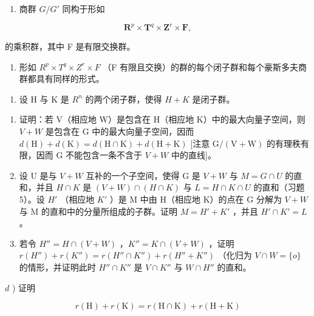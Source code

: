 \begin{enumerate}
\def\labelenumi{\alph{enumi})}
\tightlist
\item
  商群 \(G/G'\) 同构于形如
\end{enumerate}

\[
\mathbf {R} ^ {p} \times \mathbf {T} ^ {q} \times \mathbf {Z} ^ {r} \times \mathbf {F},
\]

的乘积群，其中 F 是有限交换群。

\begin{enumerate}
\def\labelenumi{\alph{enumi})}
\setcounter{enumi}{1}
\tightlist
\item
  形如 \(R^{p} \times T^{q} \times Z^{r} \times F\) （F 有限且交换）的群的每个闭子群和每个豪斯多夫商群都具有同样的形式。
\end{enumerate}

\begin{enumerate}
\def\labelenumi{\arabic{enumi})}
\setcounter{enumi}{5}
\tightlist
\item
  设 H 与 K 是 \(R^{n}\) 的两个闭子群，使得 \(H + K\) 是闭子群。
\end{enumerate}

\begin{enumerate}
\def\labelenumi{\alph{enumi})}
\item
  证明：若 V（相应地 W）是包含在 H（相应地 K）中的最大向量子空间，则 \(V + W\) 是包含在 G 中的最大向量子空间，因而 \(d(\mathrm{H}) + d(\mathrm{K}) = d(\mathrm{H} \cap \mathrm{K}) + d(\mathrm{H} + \mathrm{K})\) {[}注意 \(\mathrm{G}/(\mathrm{V} + \mathrm{W})\) 的有理秩有限，因而 G 不能包含一条不含于 \(V + W\) 中的直线{]}。
\item
  设 U 是与 \(V + W\) 互补的一个子空间，使得 G 是 \(V + W\) 与 \(M = G \cap U\) 的直和，并且 \(H \cap K\) 是 \((V + W) \cap (H \cap K)\) 与 \(L = H \cap K \cap U\) 的直和（习题 5）。设 \(H'\) （相应地 \(K'\) ）是 M 中由 H（相应地 K）的点在 G 分解为 \(V + W\) 与 M 的直和中的分量所组成的子群。证明 \(M = H' + K'\) ，并且 \(H' \cap K' = L\) 。
\item
  若令 \(H'' = H \cap (V + W)\) ，\(K'' = K \cap (V + W)\) ，证明 \(r(H'') + r(K'') = r(H'' \cap K'') + r(H'' + K'')\) （化归为 \(V \cap W = \{o\}\) 的情形，并证明此时 \(H'' \cap K''\) 是 \(V \cap K''\) 与 \(W \cap H''\) 的直和。
\end{enumerate}

\(d\) ) 证明

\[
r (\mathrm{H}) + r (\mathrm{K}) = r (\mathrm{H} \cap \mathrm{K}) + r (\mathrm{H} + \mathrm{K})
\]

